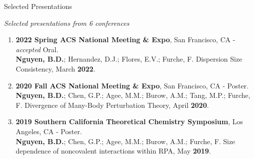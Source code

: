 \documentclass{resume} %
\begin{document}
\begin{rSection}{Selected Presentations}

\textit{Selected presentations from 6 conferences}

  \begin{enumerate}

  \item \textbf{2022 Spring ACS National Meeting \& Expo}, San Francisco, CA - \textit{accepted} Oral. \\
  \textbf{Nguyen, B.D.}; Hernandez, D.J.; Flores, E.V.; Furche, F.
  Dispersion Size Consistency, March \textbf{2022}.
    
  \item \textbf{2020 Fall ACS National Meeting \& Expo}, San Francisco, CA - Poster. \\
  \textbf{Nguyen, B.D.}; Chen, G.P.; Agee, M.M.; Burow, A.M.; Tang, M.P.;
  Furche, F. Divergence of Many-Body Perturbation Theory, April \textbf{2020}.
  
  \item \textbf{2019 Southern California Theoretical Chemistry Symposium}, Los Angeles, CA - Poster. \\
  \textbf{Nguyen, B.D.}; Chen, G.P.; Agee, M.M.; Burow, A.M.; Furche, F.  
  Size dependence of noncovalent interactions within RPA, May \textbf{2019}.
  \end{enumerate}
  
\end{rSection}
\end{document}
